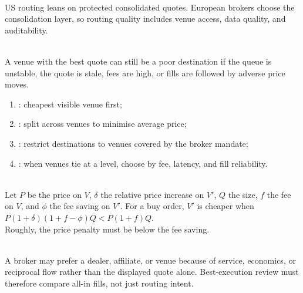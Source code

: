 \begin{principle} \\
US routing leans on protected consolidated quotes. European brokers choose the consolidation layer, so routing quality includes venue access, data quality, and auditability.
\end{principle}

\begin{caveat} \\
A venue with the best quote can still be a poor destination if the queue is unstable, the quote is stale, fees are high, or fills are followed by adverse price moves.
\end{caveat}

\begin{mechanism} 
\begin{enumerate}[label=\roman*.]
\setlength{\itemsep}{0pt}
\item {}: cheapest visible venue first;
\item {}: split across venues to minimise average price;
\item {}: restrict destinations to venues covered by the broker mandate;
\item {}: when venues tie at a level, choose by fee, latency, and fill reliability.
\end{enumerate}
\end{mechanism}

\begin{caveat} \\
Let $P$ be the price on $V$, $\delta$ the relative price increase on $V'$, $Q$ the size, $f$ the fee on $V$, and $\phi$ the fee saving on $V'$. For a buy order, $V'$ is cheaper when $P(1+\delta)(1+f-\phi)Q < P(1+f)Q$.\\
Roughly, the price penalty must be below the fee saving.
\end{caveat}

\begin{caveat} \\
A broker may prefer a dealer, affiliate, or venue because of service, economics, or reciprocal flow rather than the displayed quote alone. Best-execution review must therefore compare all-in fills, not just routing intent.
\end{caveat}

